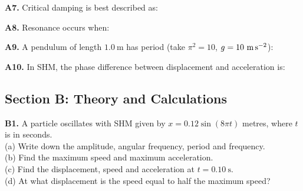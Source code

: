 \begin{exercisebox}[7]

\vspace{0.4cm}

\textbf{A7.} Critical damping is best described as:


\vspace{0.4cm}

\textbf{A8.} Resonance occurs when:


\vspace{0.4cm}

\textbf{A9.} A pendulum of length $1.0\ \text{m}$
has period (take $\pi^2 = 10$,
$g = 10\ \text{m\,s}^{-2}$):


\vspace{0.4cm}

\textbf{A10.} In SHM, the phase difference between
displacement and acceleration is:


\vspace{0.6cm}

\subsection*{Section B: Theory and Calculations}

\textbf{B1.} A particle oscillates with SHM given by
$x = 0.12\sin(8\pi t)$ metres, where $t$ is in seconds.\\[4pt]
(a) Write down the amplitude, angular frequency,
period and frequency.\\
(b) Find the maximum speed and maximum acceleration.\\
(c) Find the displacement, speed and acceleration
at $t = 0.10\ \text{s}$.\\
(d) At what displacement is the speed equal to half
the maximum speed?
\hfill{}


\end{exercisebox}
